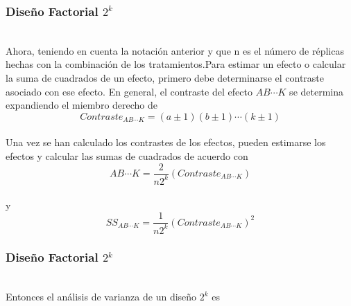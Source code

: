 \documentclass[12pt]{beamer}
\begin{document}
\begin{frame}
\frametitle{Diseño Factorial $ 2^{k} $}
~\\Ahora, teniendo en cuenta la notación anterior y que n es el número de réplicas hechas con la combinación de los tratamientos.Para estimar un efecto o calcular la suma de cuadrados de un efecto, primero debe determinarse el contraste asociado con ese efecto. En general, el contraste del efecto $AB\cdots K$ se determina expandiendo el miembro derecho de
$$Contraste_{AB\cdots K}=(a\pm 1)(b\pm 1)\cdots(k\pm 1)$$
~\\Una vez se han calculado los contrastes de los efectos, pueden estimarse los efectos y calcular las sumas de cuadrados de acuerdo con
$$AB\cdots K=\frac{2}{n2^k}(Contraste_{AB\cdots K})$$
~\\y
$$SS_{AB\cdots K}=\frac{1}{n2^k}(Contraste_{AB\cdots K})^2$$

\end{frame}

\begin{frame}
\frametitle{Diseño Factorial $ 2^{k} $}
~\\Entonces el análisis de varianza de un diseño $2^k$ es
\begin{table}[H]
  \centering
  \caption{}
  \label{tab:addlabel}%
\end{table}%
\end{frame}
\end{document}
